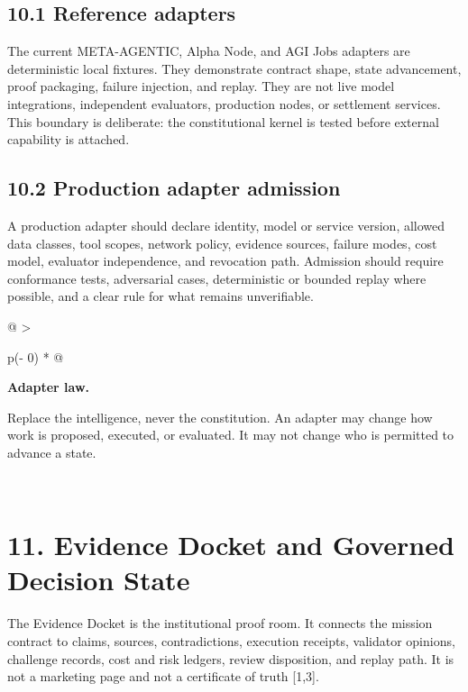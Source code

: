\subsection{10.1 Reference adapters}\label{reference-adapters}

The current META-AGENTIC, Alpha Node, and AGI Jobs adapters are
deterministic local fixtures. They demonstrate contract shape, state
advancement, proof packaging, failure injection, and replay. They are
not live model integrations, independent evaluators, production nodes,
or settlement services. This boundary is deliberate: the constitutional
kernel is tested before external capability is attached.

\subsection{10.2 Production adapter
admission}\label{production-adapter-admission}

A production adapter should declare identity, model or service version,
allowed data classes, tool scopes, network policy, evidence sources,
failure modes, cost model, evaluator independence, and revocation path.
Admission should require conformance tests, adversarial cases,
deterministic or bounded replay where possible, and a clear rule for
what remains unverifiable.

\begin{longtable}[]{@{}
  >{\raggedright\arraybackslash}p{(\columnwidth - 0\tabcolsep) * }@{}}
\toprule\noalign{}
\begin{minipage}[b]{\linewidth}\raggedright
\textbf{Adapter law.}

Replace the intelligence, never the constitution. An adapter may change
how work is proposed, executed, or evaluated. It may not change who is
permitted to advance a state.
\end{minipage} \\
\midrule\noalign{}
\endhead
\bottomrule\noalign{}
\endlastfoot
\end{longtable}

\section{11. Evidence Docket and Governed Decision
State}\label{evidence-docket-and-governed-decision-state}

The Evidence Docket is the institutional proof room. It connects the
mission contract to claims, sources, contradictions, execution receipts,
validator opinions, challenge records, cost and risk ledgers, review
disposition, and replay path. It is not a marketing page and not a
certificate of truth {[}1,3{]}.

